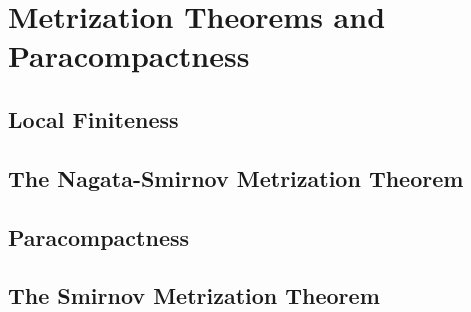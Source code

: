 \chapter{Metrization Theorems and Paracompactness}

\section{Local Finiteness}

\section{The Nagata-Smirnov Metrization Theorem}

\section{Paracompactness}

\section{The Smirnov Metrization Theorem}
